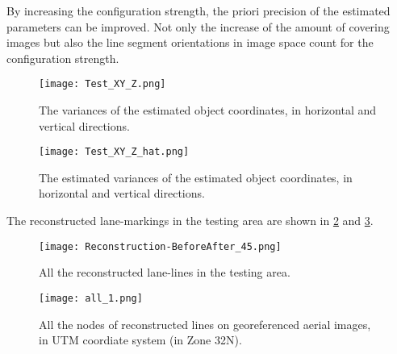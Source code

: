 By increasing the configuration strength, the priori precision of the estimated parameters can be improved. {Not only the increase of the amount of covering images but also the line segment orientations in image space count for the configuration strength}.

\begin{figure}
  \centering
  \texttt{[image: Test\_XY\_Z.png]}
  \caption{\small The variances of the estimated object coordinates, in horizontal and vertical directions.}
  \label{fig:TestSigmxx}
  \vspace{0.5cm}
  \centering
  \texttt{[image: Test\_XY\_Z\_hat.png]}
  \caption{\small The estimated variances of the estimated object coordinates, in horizontal and vertical directions.}
  \label{fig:TestSigmxxhat}
\end{figure}

The reconstructed lane-markings in the testing area are shown in \cref{fig:TestAll3D} and \cref{fig:TestAll2D}. 

\begin{figure}
	\centering
	\texttt{[image: Reconstruction-BeforeAfter\_45.png]}
	\caption{\small All the reconstructed lane-lines in the testing area.}
	\label{fig:TestAll3D}
\end{figure}

\begin{figure}
	\centering
	\texttt{[image: all\_1.png]}
	\caption{\small All the nodes of reconstructed lines on georeferenced aerial images, in UTM coordiate system (in Zone 32N).}
	\label{fig:TestAll2D}
\end{figure}

